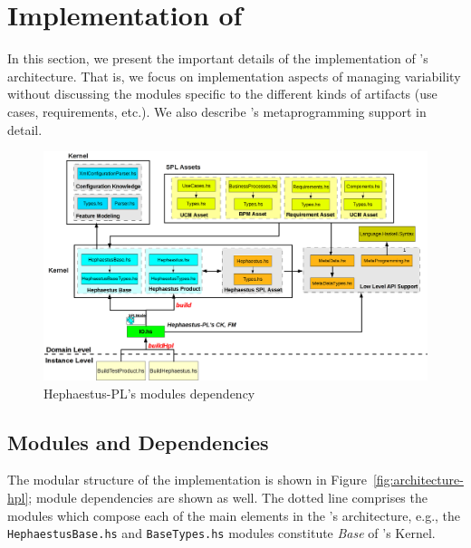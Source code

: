 
\section{Implementation of \hpl}
\label{sec:implementation}

In this section, we present the important details of the implementation of \hpl's architecture. That is, we focus on implementation aspects of managing variability without discussing the modules specific to the different kinds of artifacts (use cases, requirements, etc.). We also describe \hpl's metaprogramming support in detail.


\begin{figure}[t!]
\begin{center}
\includegraphics[width=\textwidth]{imagens/modules-hpl-v3.png}
\end{center}
\caption{Hephaestus-PL's modules dependency}
\label{fig:modules-hpl}
\end{figure}


\subsection{Modules and Dependencies}

The modular structure of the implementation is shown in Figure~\ref{fig:architecture-hpl}; module dependencies are shown as well. The dotted line comprises the modules which compose each of the main elements in the \hpl's architecture, e.g., the \texttt{HephaestusBase.hs} and \texttt{BaseTypes.hs} modules constitute \hp{} \emph{Base} of \hpl's Kernel.

